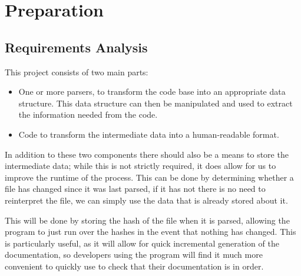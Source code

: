 



\chapter{Preparation}
\section{Requirements Analysis}
This project consists of two main parts:
\begin{itemize}
  \item One or more parsers, to transform the code base into an appropriate data
    structure. This data structure can then be manipulated and used to extract
    the information needed from the code.
  \item Code to transform the intermediate data into a human-readable format.
\end{itemize}

In addition to these two components there should also be a means to store the
intermediate data; while this is not strictly required, it does allow for us to
improve the runtime of the process. This can be done by determining whether a
file has changed since it was last parsed, if it has not there is no need to
reinterpret the file, we can simply use the data that is already stored about
it.

This will be done by storing the hash of the file when it is parsed, allowing
the program to just run over the hashes in the event that nothing has changed.
This is particularly useful, as it will allow for quick incremental generation
of the documentation, so developers using the program will find it much more
convenient to quickly use to check that their documentation is in order.

